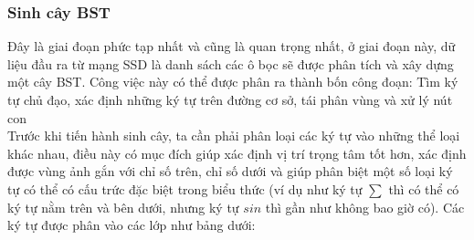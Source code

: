 \documentclass[a4paper,12pt]{article}
\begin{document}
	\subsubsection{Sinh cây BST}
	
	Đây là giai đoạn phức tạp nhất và cũng là quan trọng nhất, ở giai đoạn này, dữ liệu đầu ra từ mạng SSD là danh sách các ô bọc sẽ được phân tích và xây dựng một cây BST. Công việc này có thể được phân ra thành bốn công đoạn: Tìm ký tự chủ đạo, xác định những ký tự trên đường cơ sở, tái phân vùng và xử lý nút con\\
	
	Trước khi tiến hành sinh cây, ta cần phải phân loại các ký tự vào những thể loại khác nhau, điều này có mục đích giúp xác định vị trí trọng tâm tốt hơn, xác định được vùng ảnh gắn với chỉ số trên, chỉ số dưới và giúp phân biệt một số loại ký tự có thể có cấu trức đặc biệt trong biểu thức (ví dụ như ký tự $\sum$ thì có thể có ký tự nằm trên và bên dưới, nhưng ký tự $sin$ thì gần như không bao giờ có). Các ký tự được phân vào các lớp như bảng dưới:
	
\end{document}
